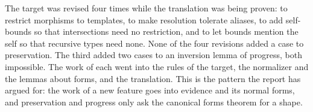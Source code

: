 The target was revised four times while the translation was being proven: to restrict morphisms to templates, to make resolution tolerate aliases, to add self-bounds so that intersections need no restriction, and to let bounds mention the self so that recursive types need none. None of the four revisions added a case to preservation. The third added two cases to an inversion lemma of progress, both impossible. The work of each went into the rules of the target, the normalizer and the lemmas about forms, and the translation. This is the pattern the report has argued for: the work of a new feature goes into evidence and its normal forms, and preservation and progress only ask the canonical forms theorem for a shape.
